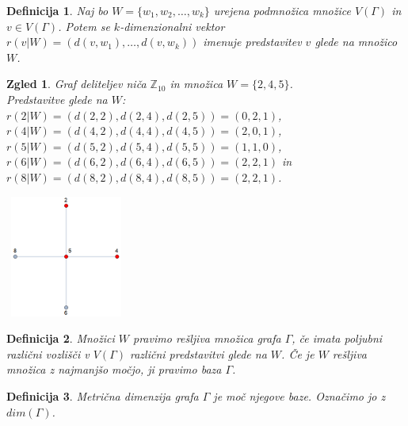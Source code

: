 \documentclass{beamer}
\def\Z{\mathbb{Z}} %
\newtheorem{definicija}{Definicija}
\newtheorem{zgled}{Zgled}
\begin{document}
    
\begin{frame}
    
    \begin{definicija}
        Naj bo $W = \{ w_1,w_2, \ldots, w_k \}$ urejena podmnožica množice $V(\Gamma)$ in 
        $v \in V(\Gamma)$. Potem 
        se $k$-dimenzionalni vektor \\
        $r(v|W)=( d(v,w_1), \ldots, d(v,w_k) )$ imenuje 
        predstavitev $v$ glede na množico $W$. 
      
    \end{definicija}
    
\end{frame}
    

\begin{frame}
    
    \begin{zgled}
        Graf deliteljev niča $\Z_{10}$ in množica $W = \{2,4,5\}$.\\
        Predstavitve glede na $W$:\\
        $r(2|W)=( d(2,2), d(2,4), d(2,5) ) = ( 0, 2, 1 )$,
        $r(4|W)=( d(4,2), d(4,4), d(4,5) ) = ( 2, 0, 1 )$,
        $r(5|W)=( d(5,2), d(5,4), d(5,5) ) = ( 1, 1, 0 )$,
        $r(6|W)=( d(6,2), d(6,4), d(6,5) ) = ( 2, 2, 1 )$ in 
        $r(8|W)=( d(8,2), d(8,4), d(8,5) ) = ( 2, 2, 1 )$.
    \end{zgled}
    \begin{center}
        \includegraphics[width=4cm, height=4cm]{z10W1.png}
    \end{center}
    
\end{frame}
    

\begin{frame}
    
    \begin{definicija}
        Množici $W$ pravimo \emph{rešljiva množica grafa $\Gamma$}, če imata poljubni različni 
        vozlišči v $V(\Gamma)$ različni predstavitvi glede na $W$. Če je $W$ rešljiva množica 
        z najmanjšo močjo, ji pravimo \emph{baza $\Gamma$}.
    \end{definicija}

    \begin{definicija}
        \emph{Metrična dimenzija grafa $\Gamma$} je moč njegove baze. Označimo jo z $dim(\Gamma)$.
    \end{definicija}
    
\end{frame}
\end{document}
